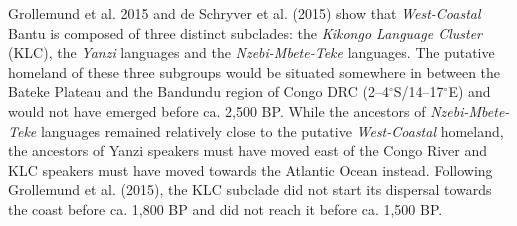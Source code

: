 \documentclass[a0]{sciposter}
\begin{document}
{\begin{minipage}[t][102cm][t]{82cm}
\begin{minipage}[t]{77cm}
\begin{multicols}{3}
\bigbreak
{\fontsize{28}{36} \selectfont Grollemund et al. 2015 and de Schryver et al. (2015) show that \textit{West-Coastal} Bantu is composed of three distinct subclades: the \textit{Kikongo Language Cluster} (KLC), the \textit{Yanzi} languages and the \textit{Nzebi-Mbete-Teke} languages. The putative homeland of these three subgroups would be situated somewhere in between the Bateke Plateau and the Bandundu region of Congo DRC (2--4$^\circ$S/14--17$^\circ$E) and would not have emerged before ca. 2,500 BP. While the ancestors of \textit{Nzebi-Mbete-Teke} languages remained relatively close to the putative \textit{West-Coastal} homeland, the ancestors of Yanzi speakers must have moved east of the Congo River and KLC speakers must have moved towards the Atlantic Ocean instead. Following Grollemund et al. (2015), the KLC subclade did not start its dispersal towards the coast before ca. 1,800 BP and did not reach it before ca. 1,500 BP.}
\vfill\null
\end{multicols}
\end{minipage}

\end{minipage}}
\end{document}
